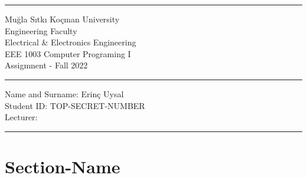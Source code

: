 \documentclass[a4paper]{article}
\begin{document}
\par\rule{\textwidth}{1.5pt}
\par
\begin{center}
  Muğla Sıtkı Koçman University \\ Engineering Faculty \\ Electrical \& Electronics Engineering \\ EEE 1003 Computer Programing I \\ Assigmnent - Fall 2022

\end{center}
\par\noindent\rule{\textwidth}{1.5pt}
\par
Name and Surname: Erinç Uysal \\
Student ID: TOP-SECRET-NUMBER \\ 
Lecturer: 
\par\noindent\rule{\textwidth}{1.5pt}
\par 
    \newpage
    \tableofcontents
    \newpage
    \section{Section-Name}
    \paragraph{}
\end{document}
